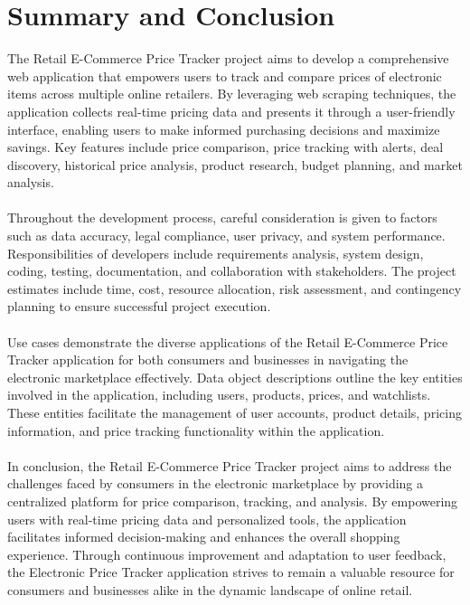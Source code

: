 \documentclass[a4paper,14pt,onecolumn]{report}
\begin{document}
	\chapter{Summary and Conclusion}
	The Retail E-Commerce Price Tracker project aims to develop a comprehensive web application that empowers users to track and compare prices of electronic items across multiple online retailers. By leveraging web scraping techniques, the application collects real-time pricing data and presents it through a user-friendly interface, enabling users to make informed purchasing decisions and maximize savings. Key features include price comparison, price tracking with alerts, deal discovery, historical price analysis, product research, budget planning, and market analysis.
	\\
	\\
	Throughout the development process, careful consideration is given to factors such as data accuracy, legal compliance, user privacy, and system performance. Responsibilities of developers include requirements analysis, system design, coding, testing, documentation, and collaboration with stakeholders. The project estimates include time, cost, resource allocation, risk assessment, and contingency planning to ensure successful project execution.
	\\
	\\
	Use cases demonstrate the diverse applications of the Retail E-Commerce Price Tracker application for both consumers and businesses in navigating the electronic marketplace effectively. Data object descriptions outline the key entities involved in the application, including users, products, prices, and watchlists. These entities facilitate the management of user accounts, product details, pricing information, and price tracking functionality within the application.
	\\
	\\
	In conclusion, the Retail E-Commerce Price Tracker project aims to address the challenges faced by consumers in the electronic marketplace by providing a centralized platform for price comparison, tracking, and analysis. By empowering users with real-time pricing data and personalized tools, the application facilitates informed decision-making and enhances the overall shopping experience. Through continuous improvement and adaptation to user feedback, the Electronic Price Tracker application strives to remain a valuable resource for consumers and businesses alike in the dynamic landscape of online retail.
	
\end{document}
